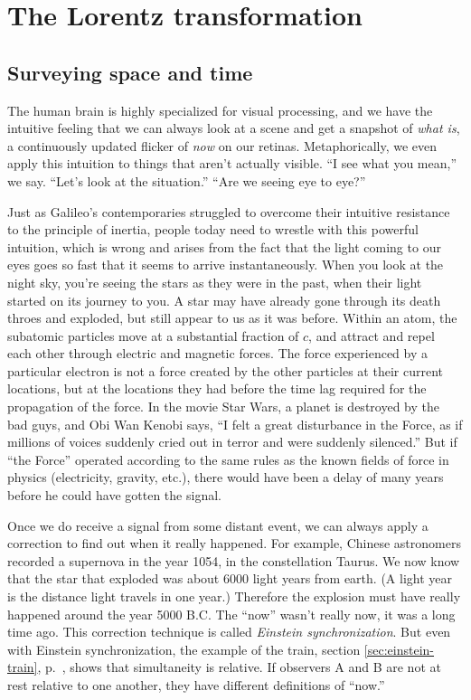 \chapter{The Lorentz transformation}

\section{Surveying space and time}

The human brain is highly specialized for visual processing, and we have
the intuitive feeling that we can always look at a scene and get a snapshot
of \emph{what is}, a continuously updated flicker of \emph{now} on our retinas.
Metaphorically, we even apply this intuition to things that aren't actually visible.
``I see what you mean,'' we say. ``Let's look at the situation.''
``Are we seeing eye to eye?''

Just as Galileo's contemporaries struggled to overcome their intuitive
resistance to the principle of inertia, people today need to wrestle with
this powerful intuition, which is wrong and arises from the fact that the
light coming to our eyes goes so fast that it seems to arrive instantaneously.
When you look at the night sky, you're seeing the stars as they were in the
past, when their light started on its journey to you. A star may have already
gone through its death throes and exploded, but still appear to us as it was before.
Within an atom, the subatomic particles move at a substantial fraction of $c$, and
attract and repel each other through electric and magnetic forces. The force
experienced by a particular electron is not a force created by the other particles
at their current locations, but at the locations they had before the time lag
required for the propagation of the force. In the movie Star Wars, a planet is
destroyed by the bad guys, and Obi Wan Kenobi says, ``I felt a great disturbance in
the Force, as if millions of voices suddenly cried out in terror and were suddenly silenced.''
But if ``the Force'' operated according to the same rules as the known fields of force
in physics (electricity, gravity, etc.), there would have been a delay of many years
before he could have gotten the signal.

Once we do receive a signal from some distant event, we can always apply a correction
to find out when it really happened. For example, Chinese astronomers recorded a
supernova in the year 1054, in the constellation Taurus. We now know that the star
that exploded was about 6000 light years from earth. (A light year is the distance
light travels in one year.) Therefore the explosion must have really happened around the
year 5000 B.C. The ``now'' wasn't really now, it was a long time ago.
This correction technique is called \emph{Einstein synchronization}.
But even with Einstein synchronization, the example of the train, section
\ref{sec:einstein-train}, p.~\pageref{sec:einstein-train}, shows that simultaneity
is relative. If  observers A and B are not at rest relative to one another, they have
different definitions of ``now.''

